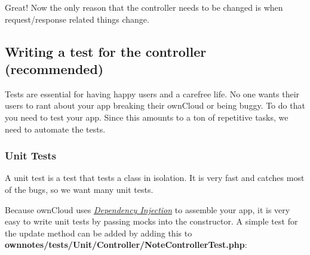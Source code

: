 \documentclass[letterpaper,10pt,english]{sphinxmanual}
\begin{document}
Great! Now the only reason that the controller needs to be changed is when request/response related things change.


\subsection{Writing a test for the controller (recommended)}
\label{app/tutorial:writing-a-test-for-the-controller-recommended}
Tests are essential for having happy users and a carefree life. No one wants their users to rant about your app breaking their ownCloud or being buggy. To do that you need to test your app. Since this amounts to a ton of repetitive tasks, we need to automate the tests.


\subsubsection{Unit Tests}
\label{app/tutorial:unit-tests}
A unit test is a test that tests a class in isolation. It is very fast and catches most of the bugs, so we want many unit tests.

Because ownCloud uses {\hyperref[app/container::doc]{\emph{Dependency Injection}}} to assemble your app, it is very easy to write unit tests by passing mocks into the constructor. A simple test for the update method can be added by adding this to \textbf{ownnotes/tests/Unit/Controller/NoteControllerTest.php}:
\end{document}
